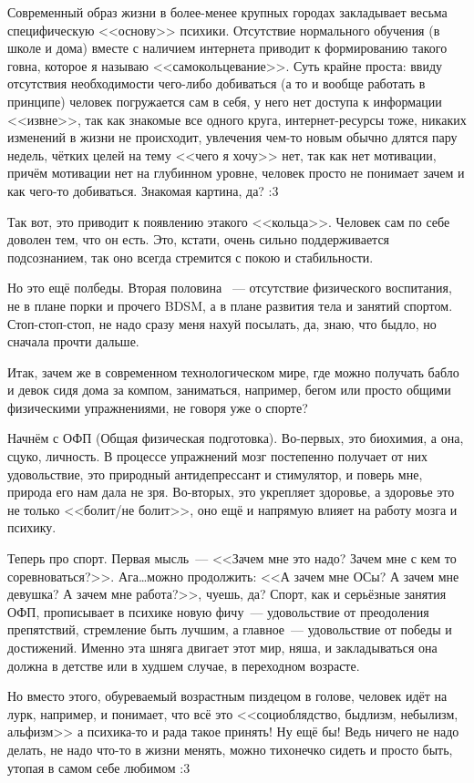 \documentclass[a4paper,14pt,oneside]{memoir}
\begin{document}
Современный образ жизни в более-менее крупных городах закладывает весьма специфическую <<основу>> психики. Отсутствие нормального обучения (в школе и дома) вместе с наличием интернета приводит к формированию такого говна, которое я называю <<самокольцевание>>. Суть крайне проста: ввиду отсутствия необходимости чего-либо добиваться (а то и вообще работать в принципе) человек погружается сам в себя, у него нет доступа к информации <<извне>>, так как знакомые все одного круга, интернет-ресурсы тоже, никаких изменений в жизни не происходит, увлечения чем-то новым обычно длятся пару недель, чётких целей на тему <<чего я хочу>> нет, так как нет мотивации, причём мотивации нет на глубинном уровне, человек просто не понимает зачем и как чего-то добиваться. Знакомая картина, да? :3

Так вот, это приводит к появлению этакого <<кольца>>. Человек сам по себе доволен тем, что он есть. Это, кстати, очень сильно поддерживается подсознанием, так оно всегда стремится с покою и стабильности.

Но это ещё полбеды. Вторая половина ~--- отсутствие физического воспитания, не в плане порки и прочего BDSM, а в плане развития тела и занятий спортом. Стоп-стоп-стоп, не надо сразу меня нахуй посылать, да, знаю, что быдло, но сначала прочти дальше. 

Итак, зачем же в современном технологическом мире, где можно получать бабло и девок сидя дома за компом, заниматься, например, бегом или просто общими физическими упражнениями, не говоря уже о спорте?

Начнём с ОФП (Общая физическая подготовка). Во-первых, это биохимия, а она, сцуко, личность. В процессе упражнений мозг постепенно получает от них удовольствие, это природный антидепрессант и стимулятор, и поверь мне, природа его нам дала не зря. Во-вторых, это укрепляет здоровье, а здоровье это не только <<болит/не болит>>, оно ещё и напрямую влияет на работу мозга и психику.

Теперь про спорт. Первая мысль~--- <<Зачем мне это надо? Зачем мне с кем то соревноваться?>>. Ага\ldots можно продолжить: <<А зачем мне ОСы? А зачем мне девушка? А зачем мне работа?>>, чуешь, да? Спорт, как и серьёзные занятия ОФП, прописывает в психике новую фичу~--- удовольствие от преодоления препятствий, стремление быть лучшим, а главное~--- удовольствие от победы и достижений. Именно эта шняга двигает этот мир, няша, и закладываться она должна в детстве или в худшем случае, в переходном возрасте.

Но вместо этого, обуреваемый возрастным пиздецом в голове, человек идёт на лурк, например, и понимает, что всё это <<социоблядство, быдлизм, небылизм, альфизм>> а психика-то и рада такое принять! Ну ещё бы! Ведь ничего не надо делать, не надо что-то в жизни менять, можно тихонечко сидеть и просто быть, утопая в самом себе любимом :3
\end{document}
